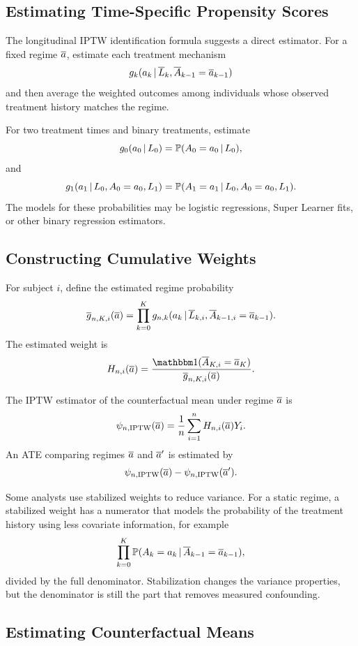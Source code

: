 \label{lec:8-6}

\subsection{Estimating Time-Specific Propensity Scores}

The longitudinal IPTW identification formula suggests a direct estimator. For a
fixed regime $\overline{a}$, estimate each treatment mechanism
\[
  g_k(a_k\,\vert\, \overline{L}_k,\overline{A}_{k-1}=\overline{a}_{k-1})
\]
and then average the weighted outcomes among individuals whose observed
treatment history matches the regime.

For two treatment times and binary treatments, estimate
\[
  g_0(a_0\,\vert\, L_0)=\mathbb{P}(A_0=a_0\,\vert\, L_0),
\]
and
\[
  g_1(a_1\,\vert\, L_0,A_0=a_0,L_1)
  =
  \mathbb{P}(A_1=a_1\,\vert\, L_0,A_0=a_0,L_1).
\]
The models for these probabilities may be logistic regressions, Super Learner
fits, or other binary regression estimators.

\subsection{Constructing Cumulative Weights}

For subject $i$, define the estimated regime probability
\[
  \overline{g}_{n,K,i}(\overline{a})
  =
  \prod_{k=0}^K
  g_{n,k}(a_k\,\vert\, \overline{L}_{k,i},\overline{A}_{k-1,i}=\overline{a}_{k-1}).
\]
The estimated weight is
\[
  H_{n,i}(\abar)
  =
  \frac{\ind(\Abar_{K,i}=\abar_K)}{\gbar_{n,K,i}(\abar)}.
\]

\begin{estimationbox}
The IPTW estimator of the counterfactual mean under regime $\overline{a}$ is
\[
  \psi_{n,\operatorname{IPTW}}(\overline{a})
  =
  \frac{1}{n}\sum_{i=1}^n
  H_{n,i}(\overline{a})Y_i.
\]
An ATE comparing regimes $\overline{a}$ and $\overline{a}'$ is estimated by
\[
  \psi_{n,\operatorname{IPTW}}(\overline{a})-\psi_{n,\operatorname{IPTW}}(\overline{a}').
\]
\end{estimationbox}

Some analysts use stabilized weights to reduce variance. For a static regime,
a stabilized weight has a numerator that models the probability of the treatment
history using less covariate information, for example
\[
  \prod_{k=0}^K
  \mathbb{P}(A_k=a_k\,\vert\, \overline{A}_{k-1}=\overline{a}_{k-1}),
\]
divided by the full denominator. Stabilization changes the variance properties,
but the denominator is still the part that removes measured confounding.

\subsection{Estimating Counterfactual Means}

